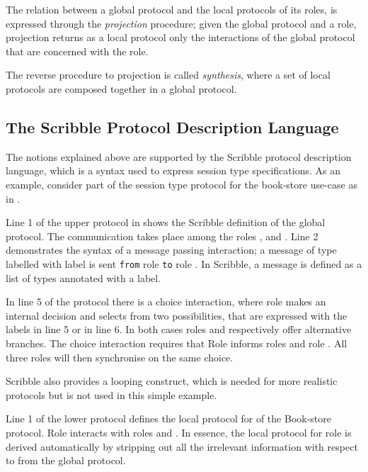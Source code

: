 The relation between a global protocol and the
local protocols of its roles, is expressed
through the {\em projection} procedure;
given the global protocol and a role, projection
returns as a local protocol only the
interactions of the global protocol that are concerned with
the role.

The reverse procedure to projection is called {\em synthesis},
where a set of local protocols are composed together in a global
protocol.


\subsection{The Scribble Protocol Description Language}
\label{sec:scribble}
The notions explained above are supported by the
Scribble protocol description language,
which is a syntax used to express session type specifications.
As an example,
consider part of the session type protocol for the book-store
use-case as in .




Line 1 of the upper protocol in  shows the
Scribble definition of the global protocol.
The communication takes place
among the roles \BuyerOne, \BuyerTwo and \Seller. Line 2 demonstrates
the syntax of a message passing interaction; a message
of type  labelled with label  is sent \lstinline|from|
role \BuyerOne \lstinline|to| role \Seller. In Scribble, a message is
defined as a list of types annotated with a label.

In line 5 of the protocol
there is a choice interaction,
where role \BuyerTwo makes an internal decision and selects
from two possibilities, that are
expressed with the labels  in line 5 or  in line 6.
In  both cases roles \BuyerOne and \Seller respectively offer
alternative branches. The choice interaction requires that
Role \BuyerTwo informs roles \BuyerOne and role \Seller. All
three roles will then synchronise on the same choice.

Scribble also provides a looping construct, which is needed for more realistic protocols but is not used in this simple example.


Line 1 of the lower protocol defines the local protocol
for \BuyerOne of the Book-store protocol. Role \BuyerOne
interacts with roles \BuyerTwo and \Seller. In essence,
the local protocol for role \BuyerOne is derived automatically
by stripping out all the irrelevant information with respect
to \BuyerOne from the global protocol.


